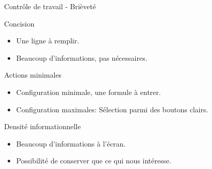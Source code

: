 \begin{frame}{Contrôle de travail - Brièveté}
  \begin{block}{Concision}
    \begin{itemize}
    \item Une ligne à remplir.
    \item Beaucoup d'informations, pas nécessaires.
    \end{itemize}
  \end{block}

  \begin{block}{Actions minimales}
    \begin{itemize}
    \item Configuration minimale, une formule à entrer.
    \item Configuration maximales: Sélection parmi des boutons clairs.
    \end{itemize}
  \end{block}

  \begin{block}{Densité informationnelle}
    \begin{itemize}
    \item Beaucoup d'informations à l'écran.
    \item Possibilité de conserver que ce qui nous intéresse.
    \end{itemize}
  \end{block}
\end{frame}
